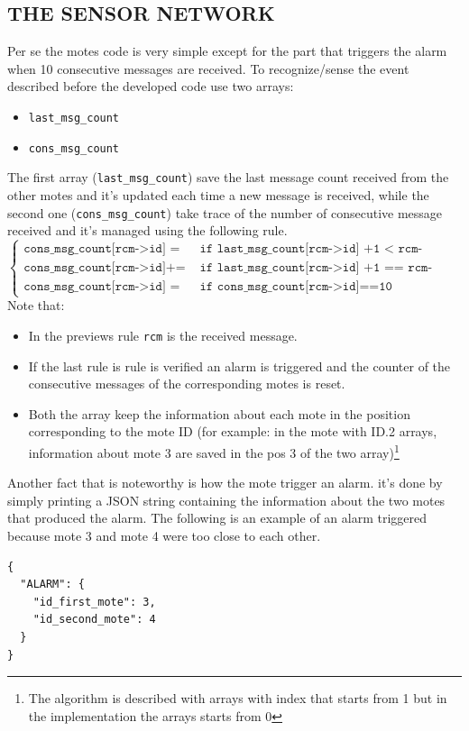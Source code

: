 \documentclass{article}
\begin{document}
\subsection{THE SENSOR NETWORK} %
Per se the motes code is very simple except for the part that triggers the alarm when 10 consecutive messages are received. To recognize/sense the event described before the developed code use two arrays:
\begin{itemize}
    \item \texttt{last\_msg\_count}    
    \item \texttt{cons\_msg\_count}
\end{itemize}
The first array (\texttt{last\_msg\_count}) save the last message count received from the other motes and it’s updated each time a new message is received, while the second one (\texttt{cons\_msg\_count}) take trace of the number of consecutive message received and it’s managed using the following rule.
\\
\[
\begin{cases}
    \texttt{cons\_msg\_count[rcm->id] = 1}   & \texttt{if last\_msg\_count[rcm->id] +1 < rcm->counter} \\
    \texttt{cons\_msg\_count[rcm->id]+= 1}  & \texttt{if last\_msg\_count[rcm->id] +1 == rcm->counter} \\
    \texttt{cons\_msg\_count[rcm->id] = 0}  & \texttt{if cons\_msg\_count[rcm->id]==10}
\end{cases}
\]
Note that:
\begin{itemize}
    \item In the previews rule \texttt{rcm} is the received message.
    \item If the last rule is rule is verified an alarm is triggered and the counter of the consecutive messages of the corresponding motes is reset.
    \item Both the array keep the information about each mote in the position corresponding to the mote ID (for example: in the mote with ID.2 arrays, information about mote 3 are saved in  the pos 3 of the two array)\footnote{The algorithm is described with arrays with index that starts from 1 but in the implementation the arrays starts from 0}
\end{itemize}
Another fact that is noteworthy is how the mote trigger an alarm. it's done by simply printing a JSON string containing the information about the two motes that produced the alarm. The following is an example of an alarm triggered because mote 3 and mote 4 were too close to each other.
\begin{verbatim}
{
  "ALARM": {
    "id_first_mote": 3,
    "id_second_mote": 4
  }
}
\end{verbatim}
\end{document}
